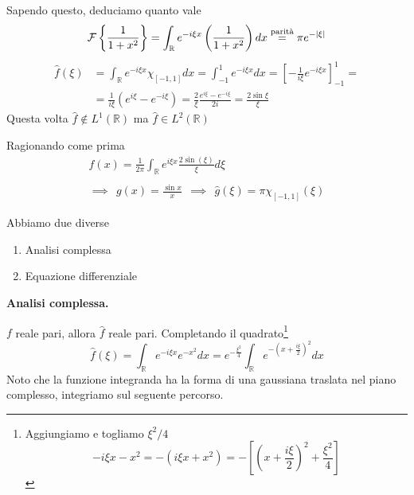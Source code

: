 Sapendo questo, deduciamo quanto vale
\begin{equation*}
\mathcal{F} \left\{\frac{1}{1+x^{2}}\right\} =\int _{\mathbb{R}} e^{-i\xi x}\left(\frac{1}{1+x^{2}}\right) dx\overset{\text{parità}}{=} \pi e^{-| \xi | }
\end{equation*}
\Soluzione
\begin{equation*}
\begin{aligned}
\hat{f} (\xi ) & =\int _{\mathbb{R}} e^{-i\xi x} \chi _{[-1,1]} dx=\int ^{1}_{-1} e^{-i\xi x} dx=\left[ -\frac{1}{i\xi } e^{-i\xi x}\right]^{1}_{-1} =\\
 & =\frac{1}{i\xi }\left( e^{i\xi } -e^{-i\xi }\right) =\frac{2}{\xi }\frac{e^{i\xi } -e^{-i\xi }}{2i} =\frac{2\sin \xi }{\xi }
\end{aligned}
\end{equation*}
Questa volta $\hat{f} \notin L^{1} (\mathbb{R} )$ ma $\hat{f} \in L^{2} (\mathbb{R} )$

Ragionando come prima
\begin{gather*}
f(x)=\frac{1}{2\pi }\int _{\mathbb{R}} e^{i\xi x}\frac{2\sin( \xi )}{\xi } d\xi \\
\\
\implies \ \ g( x) =\frac{\sin x}{x} \ \ \implies \ \ \hat{g}( \xi ) =\pi \chi _{[-1,1]} (\xi )
\end{gather*}
\Soluzione

Abbiamo due diverse
\begin{enumerate}
\item Analisi complessa
\item Equazione differenziale
\end{enumerate}

\textbf{Analisi complessa.}

$f$ reale pari, allora $\hat{f}$ reale pari. Completando il quadrato\footnote{Aggiungiamo e togliamo $\xi ^{2} /4$
\begin{equation*}
-i\xi x-x^{2} =-\left( i\xi x+x^{2}\right) =-\left[\left( x+\frac{i\xi }{2}\right)^{2} +\frac{\xi ^{2}}{4}\right]
\end{equation*}
}
\begin{equation*}
\hat{f} (\xi )=\int _{\mathbb{R}} e^{-i\xi x} e^{-x^{2}} dx=e^{-\frac{\xi ^{2}}{4}}\int _{\mathbb{R}} e^{-\left( x+\frac{i\xi }{2}\right)^{2}} dx
\end{equation*}
Noto che la funzione integranda ha la forma di una gaussiana traslata nel piano complesso, integriamo sul seguente percorso.


